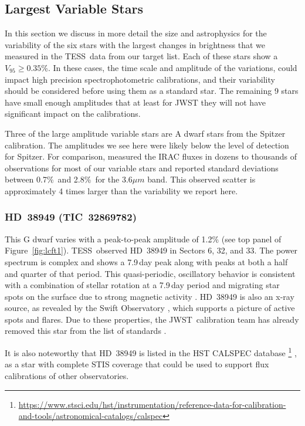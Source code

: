 \documentclass[twocolumn]{aastex631}
\newcommand{\jwst}{JWST}
\newcommand{\tess}{TESS}
\begin{document}
\subsection{Largest Variable Stars}

In this section we discuss in more detail the size and astrophysics for the variability of the six stars with the largest changes in brightness that we measured in the \tess\ data from our target list. Each of these stars show a $V_{95}\ge0.35$\%. In these cases, the time scale and amplitude of the variations, could impact high precision spectrophotometric calibrations, and their variability should be considered before using them as a standard star. The remaining 9 stars have small enough amplitudes that at least for JWST they will not have significant impact on the calibrations. 

Three of the large amplitude variable stars are A dwarf stars from the \citet{Reach2005} Spitzer calibration. The amplitudes we see here were likely below the level of detection for Spitzer. For comparison, \citet{Krick2021IRAC} measured the IRAC fluxes in dozens to thousands of observations for most of our variable stars and reported standard deviations between 0.7\%\ and 2.8\%\ for the 3.6$\mu m$ band.  This observed scatter is approximately 4 times larger than the variability we report here.


\subsubsection{HD~38949 (TIC~32869782)}

This G dwarf varies with a peak-to-peak amplitude of 1.2\% (see top panel of Figure~\ref{fig:lcft1}). \tess\ observed HD~38949 in Sectors 6, 32, and 33.  The power spectrum is complex and shows a 7.9\,day peak along with peaks at both a half and quarter of that period. This quasi-periodic, oscillatory behavior is consistent with a combination of stellar rotation at a 7.9\,day period and migrating star spots on the surface due to strong magnetic activity \citep{Santos2021}.  HD~38949 is also an x-ray source, as revealed by the Swift Observatory \citep{Swift2020,Evans2020vizier}, which supports a picture of active spots and flares. Due to these properties, the \jwst\ calibration team has already removed this star from the list of standards \citep{Gordon2022inprep}.

It is also noteworthy that HD~38949 is listed in the HST CALSPEC database  \footnote{\url{https://www.stsci.edu/hst/instrumentation/reference-data-for-calibration-and-tools/astronomical-catalogs/calspec}} \citep{Bohlin2014PASP126}, as a star with complete STIS coverage that could be used to support flux calibrations of other observatories.
\end{document}

